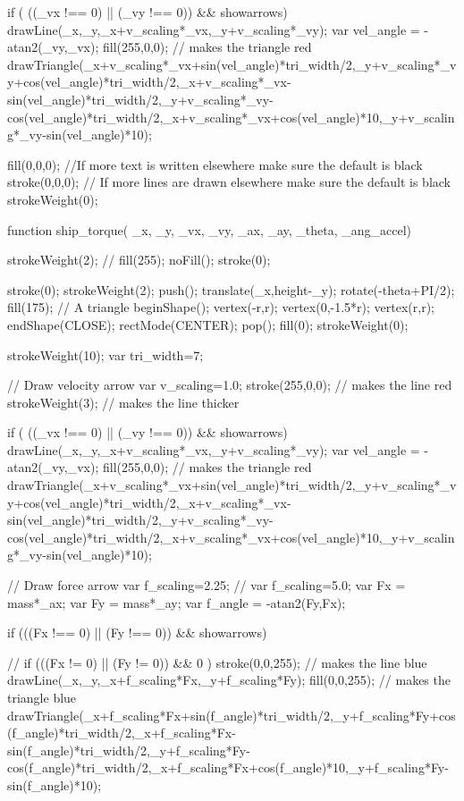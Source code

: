 \documentclass{ximera}
\begin{document}
\begin{javascriptCode}
{    if ( ((_vx !== 0) || (_vy !== 0)) && showarrows) {
        drawLine(_x,_y,_x+v_scaling*_vx,_y+v_scaling*_vy);
        var vel_angle = -atan2(_vy,_vx);
        fill(255,0,0); // makes the triangle red
        drawTriangle(_x+v_scaling*_vx+sin(vel_angle)*tri_width/2,_y+v_scaling*_vy+cos(vel_angle)*tri_width/2,_x+v_scaling*_vx-sin(vel_angle)*tri_width/2,_y+v_scaling*_vy-cos(vel_angle)*tri_width/2,_x+v_scaling*_vx+cos(vel_angle)*10,_y+v_scaling*_vy-sin(vel_angle)*10);
    }
      
    fill(0,0,0); //If more text is written elsewhere make sure the default is black
    stroke(0,0,0); // If more lines are drawn elsewhere make sure the default is black
    strokeWeight(0);

}

function ship_torque( _x,  _y, _vx, _vy, _ax, _ay, _theta, _ang_accel)
{
    strokeWeight(2);
    //    fill(255);
    noFill();
    stroke(0);

    stroke(0);
    strokeWeight(2);
    push();
    translate(_x,height-_y);
    rotate(-theta+PI/2);
    fill(175);
    // A triangle
    beginShape();
    vertex(-r,r);
    vertex(0,-1.5*r);
    vertex(r,r);
    endShape(CLOSE);
    rectMode(CENTER);
    pop();
    fill(0);
    strokeWeight(0);
  
  
  
    strokeWeight(10);
    var tri_width=7;

    // Draw velocity arrow
    var v_scaling=1.0;
    stroke(255,0,0); // makes the line red
    strokeWeight(3); // makes the line thicker

    if ( ((_vx !== 0) || (_vy !== 0)) && showarrows) {
        drawLine(_x,_y,_x+v_scaling*_vx,_y+v_scaling*_vy);
        var vel_angle = -atan2(_vy,_vx);
        fill(255,0,0); // makes the triangle red
        drawTriangle(_x+v_scaling*_vx+sin(vel_angle)*tri_width/2,_y+v_scaling*_vy+cos(vel_angle)*tri_width/2,_x+v_scaling*_vx-sin(vel_angle)*tri_width/2,_y+v_scaling*_vy-cos(vel_angle)*tri_width/2,_x+v_scaling*_vx+cos(vel_angle)*10,_y+v_scaling*_vy-sin(vel_angle)*10);
    }

     // Draw force arrow
    var f_scaling=2.25;
//    var f_scaling=5.0;
    var Fx = mass*_ax;
    var Fy = mass*_ay;
    var f_angle = -atan2(Fy,Fx);

    if (((Fx !== 0) || (Fy !== 0)) && showarrows) {
//    if (((Fx != 0) || (Fy != 0)) && 0 ) {
    stroke(0,0,255); // makes the line blue
    drawLine(_x,_y,_x+f_scaling*Fx,_y+f_scaling*Fy);
    fill(0,0,255); // makes the triangle blue
    drawTriangle(_x+f_scaling*Fx+sin(f_angle)*tri_width/2,_y+f_scaling*Fy+cos(f_angle)*tri_width/2,_x+f_scaling*Fx-sin(f_angle)*tri_width/2,_y+f_scaling*Fy-cos(f_angle)*tri_width/2,_x+f_scaling*Fx+cos(f_angle)*10,_y+f_scaling*Fy-sin(f_angle)*10);    
    }
  
}}
\end{javascriptCode}
\end{document}

